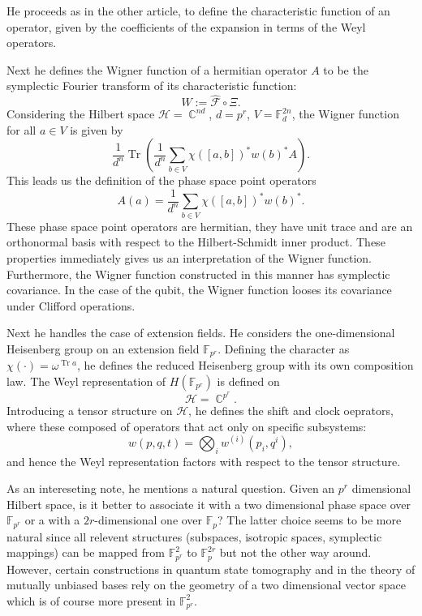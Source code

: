 \documentclass[a4paper]{article}
\DeclareMathOperator{\C}{\mathbb{C}}
\DeclareMathOperator{\Tr}{Tr}
\begin{document}
  He proceeds as in the other article, to define the
  characteristic function of an operator, given by the
  coefficients of the expansion in terms of the Weyl
  operators.

  Next he defines the Wigner function of a hermitian
  operator $A$ to be the symplectic Fourier transform of its
  characteristic function:
  \[
    W := \hat{\mathcal F} \circ \Xi.
  \] 
  Considering the Hilbert space $\mathcal H = \C^{nd}$, $d =
  p^{r}$, $V = \mathbb F_d^{2n}$, the Wigner function for
  all $a \in V$ is given by
  \[
    \frac{1}{d^{n}}
    \Tr\left( 
      \frac{1}{d^{n}} \sum_{b \in V}^{}
      \chi([a,b])^{*}w(b)^{*} A
    \right) .
  \] 
  This leads us the definition of the phase space point
  operators
  \[
    A(a)
    = \frac{1}{d^{n}} \sum_{b \in V}^{}
    \chi([a,b])^{*}w(b)^{*}.
  \] 
  These phase space point operators are hermitian, they have
  unit trace and are an orthonormal basis with respect to
  the Hilbert-Schmidt inner product. These properties
  immediately gives us an interpretation of the Wigner
  function. Furthermore, the Wigner function constructed in
  this manner has symplectic covariance. In the case of the
  qubit, the Wigner function looses its covariance under
  Clifford operations.

  Next he handles the case of extension fields. He considers
  the one-dimensional Heisenberg group on an extension field
  $\mathbb F_{p^{r}}$. Defining the character as
  $\chi(\cdot) = \omega^{\Tr a}$, he defines the reduced
  Heisenberg group with its own composition law. The Weyl
  representation of $H(\mathbb F_{p^{r}})$ is defined on
  \[
    \mathcal H = \C^{p^{r}}.
  \] 
  Introducing a tensor structure on $\mathcal H$, he defines
  the shift and clock oeprators, where these composed of
  operators that act only on specific subsystems:
  \[
    w(p,q,t) 
    = \bigotimes_i w^{(i)}(p_i,q^{i}),
  \] 
  and hence the Weyl representation factors with respect to
  the tensor structure.

  As an intereseting note, he mentions a natural question.
  Given an $p^{r}$ dimensional Hilbert space, is it better
  to associate it with a two dimensional phase space over
  $\mathbb F_{p^{r}}$ or a with a $2r$-dimensional one over
  $\mathbb F_p$? The latter choice seems to be more natural
  since all relevent structures (subspaces, isotropic
  spaces, symplectic mappings) can be mapped from $\mathbb
  F_{p^{r}}^{2}$ to $\mathbb F_p^{2r}$ but not the other way
  around. However, certain constructions in quantum state
  tomography and in the theory of mutually unbiased bases
  rely on the geometry of a two dimensional vector space
  which is of course more present in $\mathbb F_{p^{r}}^2$.
\end{document}
